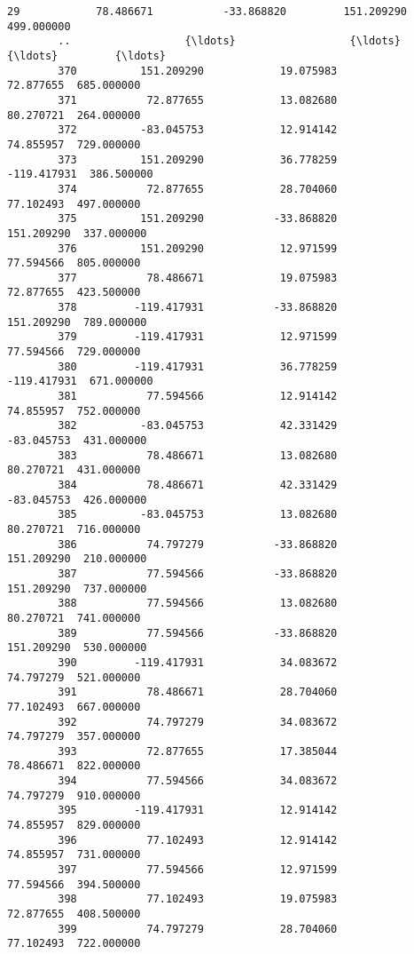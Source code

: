 \documentclass[11pt]{article}
\begin{document}
\begin{Verbatim}[commandchars=\\\{\}]
        29            78.486671           -33.868820         151.209290  499.000000   
        ..                  {\ldots}                  {\ldots}                {\ldots}         {\ldots}   
        370          151.209290            19.075983          72.877655  685.000000   
        371           72.877655            13.082680          80.270721  264.000000   
        372          -83.045753            12.914142          74.855957  729.000000   
        373          151.209290            36.778259        -119.417931  386.500000   
        374           72.877655            28.704060          77.102493  497.000000   
        375          151.209290           -33.868820         151.209290  337.000000   
        376          151.209290            12.971599          77.594566  805.000000   
        377           78.486671            19.075983          72.877655  423.500000   
        378         -119.417931           -33.868820         151.209290  789.000000   
        379         -119.417931            12.971599          77.594566  729.000000   
        380         -119.417931            36.778259        -119.417931  671.000000   
        381           77.594566            12.914142          74.855957  752.000000   
        382          -83.045753            42.331429         -83.045753  431.000000   
        383           78.486671            13.082680          80.270721  431.000000   
        384           78.486671            42.331429         -83.045753  426.000000   
        385          -83.045753            13.082680          80.270721  716.000000   
        386           74.797279           -33.868820         151.209290  210.000000   
        387           77.594566           -33.868820         151.209290  737.000000   
        388           77.594566            13.082680          80.270721  741.000000   
        389           77.594566           -33.868820         151.209290  530.000000   
        390         -119.417931            34.083672          74.797279  521.000000   
        391           78.486671            28.704060          77.102493  667.000000   
        392           74.797279            34.083672          74.797279  357.000000   
        393           72.877655            17.385044          78.486671  822.000000   
        394           77.594566            34.083672          74.797279  910.000000   
        395         -119.417931            12.914142          74.855957  829.000000   
        396           77.102493            12.914142          74.855957  731.000000   
        397           77.594566            12.971599          77.594566  394.500000   
        398           77.102493            19.075983          72.877655  408.500000   
        399           74.797279            28.704060          77.102493  722.000000   
        

\end{Verbatim}
\end{document}
